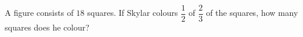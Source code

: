 A figure consists of $18$ squares. If Skylar colours $\dfrac12$ of $\dfrac23$ of the squares, how many squares does he colour?
